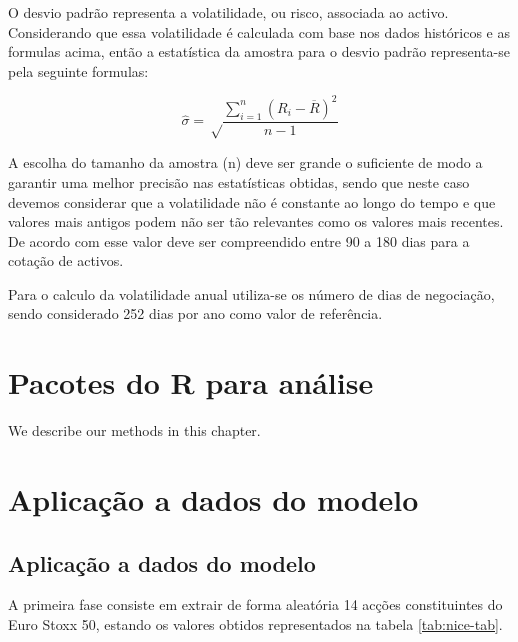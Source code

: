 \documentclass[
  12pt,
  a4paper,
  openany]{book}
\begin{document}
O desvio padrão representa a volatilidade, ou risco, associada ao activo. Considerando que essa volatilidade é calculada com base nos dados históricos e as formulas acima, então a estatística da amostra para o desvio padrão representa-se pela seguinte formulas:

\begin{equation} 
  \hat{\sigma} = \sqrt\frac{\displaystyle\sum_{i=1}^n (R_i-\overline{R})^2}{n-1}
  \label{eq:estdesviopadrao}
\end{equation}

A escolha do tamanho da amostra (n) deve ser grande o suficiente de modo a garantir uma melhor precisão nas estatísticas obtidas, sendo que neste caso devemos considerar que a volatilidade não é constante ao longo do tempo e que valores mais antigos podem não ser tão relevantes como os valores mais recentes. De acordo com \citep{Hull2018} esse valor deve ser compreendido entre 90 a 180 dias para a cotação de activos.

Para o calculo da volatilidade anual utiliza-se os número de dias de negociação, sendo considerado 252 dias por ano como valor de referência.

\hypertarget{pacotes-do-r-para-anuxe1lise}{%
\chapter{Pacotes do R para análise}\label{pacotes-do-r-para-anuxe1lise}}

\newpage

We describe our methods in this chapter.

\hypertarget{aplicauxe7uxe3o-a-dados-do-modelo}{%
\chapter{Aplicação a dados do modelo}\label{aplicauxe7uxe3o-a-dados-do-modelo}}

\endgroup
\newpage

\hypertarget{aplicauxe7uxe3o-a-dados-do-modelo-1}{%
\section{Aplicação a dados do modelo}\label{aplicauxe7uxe3o-a-dados-do-modelo-1}}

A primeira fase consiste em extrair de forma aleatória 14 acções constituintes do Euro Stoxx 50, estando os valores obtidos representados na tabela \ref{tab:nice-tab}.
\scriptsize
\end{document}
